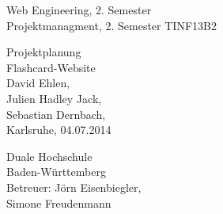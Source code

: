 \documentclass{article}
\newcommand{\appname}{Flashcard-Website}
\begin{document}
\begin{titlepage}
    \large
    \begin{flushleft}
        Web Engineering, 2. Semester \\
        Projektmanagment, 2. Semester
        TINF13B2
    \end{flushleft}
    
    \vfill

    \begin{center}
        \Huge Projektplanung\\
        \Large \appname \\
        \vspace{1cm}
        \normalsize David Ehlen, \\Julien Hadley Jack, \\Sebastian Dernbach, \\
        \vspace\medskipamount
        \vspace\medskipamount
        Karlsruhe, 04.07.2014
    \end{center}
    
    \vfill
    
    \begin{flushright}
        Duale Hochschule \\
        Baden-Württemberg \\
        \vspace\medskipamount
        Betreuer: Jörn Eisenbiegler,\\
        Simone Freudenmann
    \end{flushright}
\end{titlepage}

\newpage

\pagestyle{empty}
\tableofcontents
\cleardoublepage

\setcounter{page}{1}
\pagestyle{plain}
\setcounter{page}{1}







%









\end{document}
